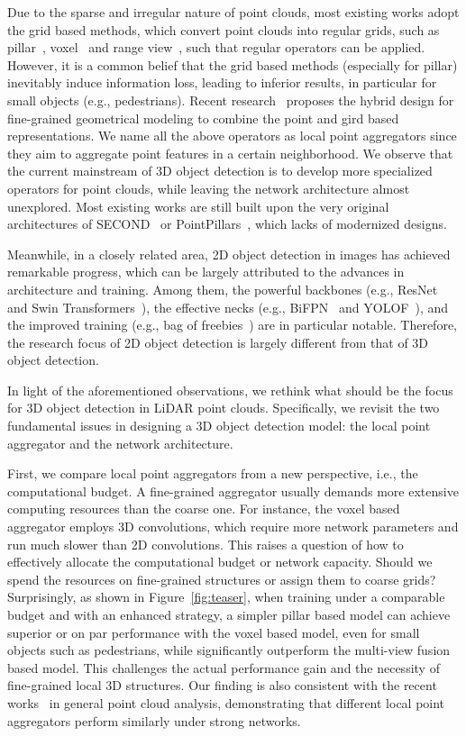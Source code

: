\documentclass[10pt,twocolumn,letterpaper]{article}
\begin{document}
Due to the sparse and irregular nature of point clouds, most existing works adopt the grid based methods, which convert point clouds into regular grids, such as pillar~\cite{lang2019pointpillars}, voxel~\cite{zhou2018voxelnet} and range view~\cite{meyer2019lasernet}, such that regular operators can be applied. 
However, it is a common belief that the grid based methods (especially for pillar) inevitably induce information loss, leading to inferior results, in particular for small objects (e.g., pedestrians). Recent research~\cite{shi2021pv} proposes the hybrid design for fine-grained geometrical modeling to combine the point and gird based representations. We name all the above operators as local point aggregators since they aim to aggregate point features in a certain neighborhood. We observe that the current mainstream of 3D object detection is to develop more specialized operators for point clouds, while leaving the network architecture almost unexplored. Most existing works are still built upon the very original architectures of SECOND~\cite{yan2018second} or PointPillars~\cite{lang2019pointpillars}, which lacks of modernized designs.


Meanwhile, in a closely related area, 2D object detection in images has achieved remarkable progress, which can be largely attributed to the advances in architecture and training. Among them, the powerful backbones (e.g., ResNet~\cite{he2016deep} and Swin Transformers~\cite{liu2021swin}), the effective necks (e.g., BiFPN~\cite{tan2020efficientdet} and YOLOF~\cite{yolof}), and the improved training (e.g., bag of freebies~\cite{freebies, yolov4}) are in particular notable. Therefore, the research focus of 2D object detection is largely different from that of 3D object detection.

In light of the aforementioned observations, we rethink what should be the focus for 3D object detection in LiDAR point clouds. Specifically, we revisit the two fundamental issues in designing a 3D object detection model: the local point aggregator and the network architecture. 

First, we compare local point aggregators from a new perspective, i.e., the computational budget. A fine-grained aggregator usually demands more extensive computing resources than the coarse one. For instance, the voxel based aggregator employs 3D convolutions, which require more network parameters and run much slower than 2D convolutions. This raises a question of how to effectively allocate the computational budget or network capacity. Should we spend the resources on fine-grained structures or assign them to coarse grids? Surprisingly, as shown in Figure~\ref{fig:teaser}, when training under a comparable budget and with an enhanced strategy, 
a simpler pillar based model can achieve superior or on par performance with the voxel based model, even for small objects such as pedestrians, while significantly outperform the multi-view fusion based model. This challenges the actual performance gain and the necessity of fine-grained local 3D structures. Our finding is also consistent with the recent works~\cite{liu2020closer, qian2022pointnext} in general point cloud analysis, demonstrating that different local point aggregators perform similarly under strong networks. 
\end{document}
